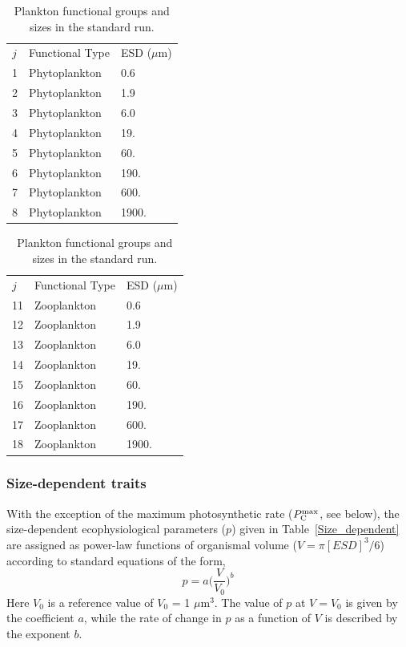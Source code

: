 \documentclass[gmd, manuscript]{copernicus}
\begin{document}
{\begin{table}[htp!]
\begin{center}
\caption{Plankton functional groups and sizes in the standard run.}
\begin{tabular}{lll}
\hline 
$j$ & Functional Type & ESD ($\mu$m) \\ [+1ex]
1 & Phytoplankton & 0.6 \\
2 & Phytoplankton & 1.9 \\
3 & Phytoplankton & 6.0 \\
4 & Phytoplankton & 19. \\
5 & Phytoplankton & 60. \\
6 & Phytoplankton & 190. \\
7 & Phytoplankton & 600. \\
8 & Phytoplankton & 1900. \\
\hline 
\end{tabular} 
\begin{tabular}{lll}
\hline 
$j$ & Functional Type & ESD ($\mu$m) \\ [+1ex]
11 & Zooplankton & 0.6 \\
12 & Zooplankton & 1.9 \\
13 & Zooplankton & 6.0 \\
14 & Zooplankton & 19. \\
15 & Zooplankton & 60. \\
16 & Zooplankton & 190. \\
17 & Zooplankton & 600. \\
18 & Zooplankton & 1900. \\
\hline 
\end{tabular} 
\label{planktonconfig}
\end{center}
\end{table}

\subsubsection{Size-dependent traits}\label{size_dep_traits}

With the exception of the maximum photosynthetic rate ($P^{\rm max}_{\rm C}$, see below), the size-dependent ecophysiological parameters ($p$) given in Table~\ref{Size_dependent} are assigned as power-law functions of organismal volume ($V=\pi [ESD]^3/6$) according to standard equations of the form,
%
\begin{equation}
p=a\Big(\frac{V}{V_0}\Big)^b
\label{powerlaw}
\end{equation}
%
Here $V_0$ is a reference value of $V_0$ = 1 $\mu$m$^3$. The value of $p$ at $V=V_0$ is given by the coefficient $a$, while the rate of change in $p$ as a function of $V$ is described by the exponent $b$.

}
\end{document}
